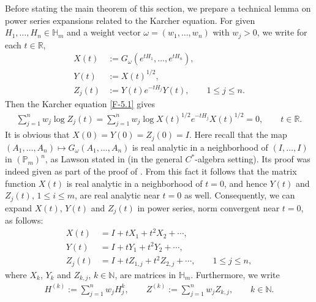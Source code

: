 \documentclass[11pt,reqno]{article}
\numberwithin{equation}{section}
\def\bR{\mathbb{R}}
\def\bN{\mathbb{N}}
\def\bH{\mathbb{H}}
\def\bP{\mathbb{P}}
\begin{document}
Before stating the main theorem of this section, we prepare a technical lemma on power series expansions
related to the Karcher equation. For given $H_1,\dots,H_n\in\bH_m$ and a weight vector
$\omega=(w_1,\dots,w_n)$ with $w_j>0$, we write for each $t\in\bR$,
\begin{align}
X(t)&:=G_\omega(e^{tH_1},\dots,e^{tH_n}), \label{F-5.9}\\
Y(t)&:=X(t)^{1/2}, \nonumber\\
Z_j(t)&:=Y(t)e^{-tH_j}Y(t),\qquad1\le j\le n. \nonumber
\end{align}
Then the Karcher equation \eqref{F-5.1} gives
\begin{align}\label{F-5.10}
\sum_{j=1}^nw_j\log Z_j(t)=\sum_{j=1}^nw_j\log X(t)^{1/2}e^{-tH_j}X(t)^{1/2}=0,\qquad t\in\bR.
\end{align}
It is obvious that $X(0)=Y(0)=Z_j(0)=I$. Here recall that the map
$(A_1,\dots,A_n)\mapsto G_\omega(A_1,\dots,A_n)$ is real analytic in a neighborhood of $(I,\dots,I)$ in
$(\bP_m)^n$, as Lawson stated in \cite[Theorem 7.2]{Law} (in the general $C^*$-algebra setting). Its proof was
indeed given as part of the proof of \cite[Theorem 6.3]{LL2}. From this fact it follows that the matrix function
$X(t)$ is real analytic in a neighborhood of $t=0$, and hence $Y(t)$ and $Z_j(t)$, $1\le i\le m$, are real analytic
near $t=0$ as well. Consequently, we can expand $X(t)$, $Y(t)$ and $Z_j(t)$ in power series, norm convergent
near $t=0$, as follows:
\begin{align}
X(t)&=I+tX_1+t^2X_2+\cdots, \label{F-5.11}\\
Y(t)&=I+tY_1+t^2Y_2+\cdots, \nonumber\\
Z_j(t)&=I+tZ_{1,j}+t^2Z_{2,j}+\cdots,\qquad1\le j\le n, \nonumber
\end{align}
where $X_k$, $Y_k$ and $Z_{k,j}$, $k\in\bN$, are matrices in $\bH_m$. Furthermore, we write
\begin{align}\label{F-5.12}
H^{(k)}:=\sum_{j=1}^nw_jH_j^k,\qquad
Z^{(k)}:=\sum_{j=1}^nw_jZ_{k,j},\qquad k\in\bN.
\end{align}
\end{document}
